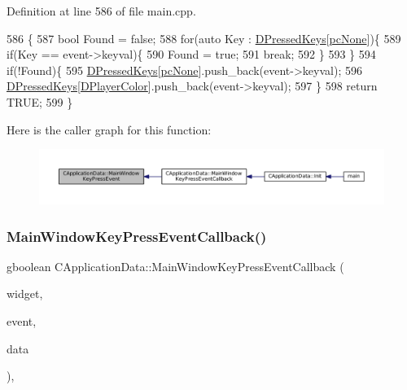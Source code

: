 Definition at line 586 of file main.\+cpp.


\begin{DoxyCode}
586                                                                                        \{
587     \textcolor{keywordtype}{bool} Found = \textcolor{keyword}{false};
588     \textcolor{keywordflow}{for}(\textcolor{keyword}{auto} Key : \hyperlink{classCApplicationData_ac6f50c764f7561c0bd2a9fbce55b2701}{DPressedKeys}[\hyperlink{GameDataTypes_8h_aafb0ca75933357ff28a6d7efbdd7602fa88767aa8e02c7b3192bbab4127b3d729}{pcNone}])\{
589         \textcolor{keywordflow}{if}(Key == event->keyval)\{
590             Found = \textcolor{keyword}{true};
591             \textcolor{keywordflow}{break};
592         \}
593     \}
594     \textcolor{keywordflow}{if}(!Found)\{
595         \hyperlink{classCApplicationData_ac6f50c764f7561c0bd2a9fbce55b2701}{DPressedKeys}[\hyperlink{GameDataTypes_8h_aafb0ca75933357ff28a6d7efbdd7602fa88767aa8e02c7b3192bbab4127b3d729}{pcNone}].push\_back(event->keyval);
596         \hyperlink{classCApplicationData_ac6f50c764f7561c0bd2a9fbce55b2701}{DPressedKeys}[\hyperlink{classCApplicationData_a53550939b20cba70570f113e4d1c5d02}{DPlayerColor}].push\_back(event->keyval);
597     \}
598     \textcolor{keywordflow}{return} TRUE;
599 \}
\end{DoxyCode}
Here is the caller graph for this function\+:
\nopagebreak
\begin{figure}[H]
\begin{center}
\leavevmode
\includegraphics[width=350pt]{classCApplicationData_a9b451765c93ecf00322f5450d29bfffe_icgraph}
\end{center}
\end{figure}
\hypertarget{classCApplicationData_aca6cce5b1cd5142984d2880294ff6ed4}{}\label{classCApplicationData_aca6cce5b1cd5142984d2880294ff6ed4} 
\subsubsection{\texorpdfstring{Main\+Window\+Key\+Press\+Event\+Callback()}{MainWindowKeyPressEventCallback()}}
{\footnotesize\ttfamily gboolean C\+Application\+Data\+::\+Main\+Window\+Key\+Press\+Event\+Callback (\begin{DoxyParamCaption}\item[{Gtk\+Widget $\ast$}]{widget,  }\item[{Gdk\+Event\+Key $\ast$}]{event,  }\item[{gpointer}]{data }\end{DoxyParamCaption})\hspace{0.3cm}{\ttfamily [static]}, {\ttfamily [protected]}}



